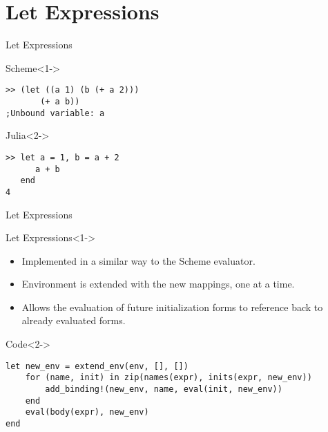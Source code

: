 \documentclass[aspectratio=169]{beamer}
\begin{document}
\section{Let Expressions}
\begin{frame}[fragile]{Let Expressions}
    \begin{exampleblock}{Scheme}<1->
        \footnotesize \begin{verbatim}
>> (let ((a 1) (b (+ a 2)))
       (+ a b))
;Unbound variable: a
        \end{verbatim}
    \end{exampleblock}
    \begin{exampleblock}{Julia}<2->
        \footnotesize \begin{verbatim}
>> let a = 1, b = a + 2
      a + b
   end
4
        \end{verbatim}
    \end{exampleblock}
\end{frame}

\begin{frame}[fragile]{Let Expressions}
    \begin{block}{Let Expressions}<1->
        \begin{itemize}
            \item<1-> Implemented in a similar way to the Scheme evaluator.
            \item<3-> Environment is extended with the new mappings, one at a time.
            \item<4-> Allows the evaluation of future initialization forms to reference back to already evaluated forms.
        \end{itemize}
    \end{block}
    \begin{exampleblock}{Code}<2->
        \footnotesize \begin{verbatim}
let new_env = extend_env(env, [], [])
    for (name, init) in zip(names(expr), inits(expr, new_env))
        add_binding!(new_env, name, eval(init, new_env))
    end
    eval(body(expr), new_env)
end\end{verbatim}
    \end{exampleblock}
\end{frame}
\end{document}
